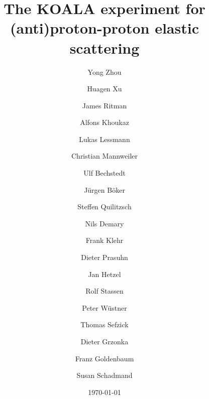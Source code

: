 \documentclass[number,5p]{elsarticle}
\begin{document}
\begin{frontmatter}	
  \title{The KOALA experiment for (anti)proton-proton elastic scattering}
  \date{\today}

  \author[ikp]{Yong Zhou}
  \author[ikp]{Huagen Xu}
  \author[ikp,bochum]{James Ritman}

  \author[muenster]{Alfons Khoukaz}
  \author[muenster]{Lukas Lessmann}
  \author[muenster]{Christian Mannweiler}

  \author[ikp]{Ulf Bechstedt}
  \author[ikp]{Jürgen Böker}
  \author[ikp]{Steffen Quilitzsch}
  \author[ikp]{Nils Demary}
  \author[ikp]{Frank Klehr}

  \author[ikp]{Dieter Prasuhn}
  \author[ikp]{Jan Hetzel}
  \author[ikp]{Rolf Stassen}

  \author[zea]{Peter Wüstner}
  \author[ikp]{Thomas Sefzick}

  \author[ikp]{Dieter Grzonka}
  \author[ikp]{Franz Goldenbaum}
  \author[ikp]{Susan Schadmand}


  \address[ikp]{Institut für Kernphysik, Forschungszentrum Jülich, Jülich, 52425, Germany}
  \address[muenster]{Institut für Kernphysik, Universität Münster, Münster, 48149, Germany}
  \address[zea]{Zentralinstitut für Engineering, Elektronik und Analytik, Forschungszentrum Jülich, Jülich, 52425, Germany}
  \address[bochum]{Ruhr-Universität Bochum, Bochum, 44780, Germany}


  \begin{abstract}



\end{abstract}
\end{frontmatter}
\end{document}
